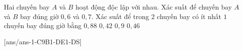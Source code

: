 \begin{ex}%
Hai chuyến bay $A$ và $B$ hoạt động độc lập với nhau. Xác suất để chuyến bay $A$ và $B$ bay đúng giờ $0{,}6$ và $0{,}7$. Xác suất để trong $2$ chuyến bay có ít nhất $1$ chuyến bay đúng giờ bằng
	\choice
		{\True $0{,}88$}
		{$0{,}42$}
		{$0{,}9$}
		{$0{,}46$}
\end{ex}
\cauds
{}[ans/ans-1-C9B1-DE1-DS]

